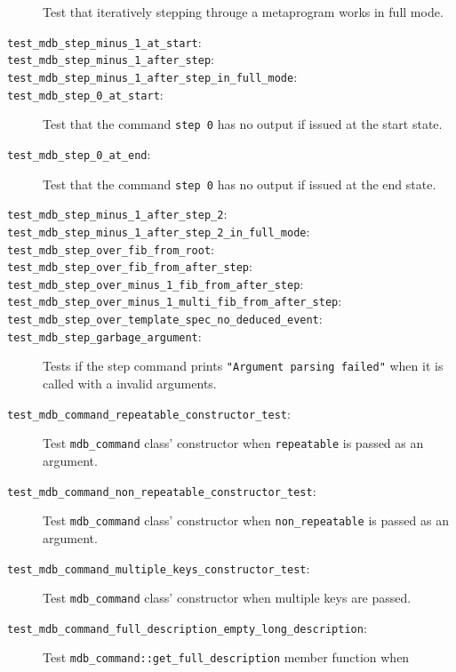 \begin{description}
        Test that iteratively stepping througe a metaprogram works in full
        mode.
    \item[\texttt{test\_mdb\_step\_minus\_1\_at\_start}:]
    \item[\texttt{test\_mdb\_step\_minus\_1\_after\_step}:]
    \item[\texttt{test\_mdb\_step\_minus\_1\_after\_step\_in\_full\_mode}:]
    \item[\texttt{test\_mdb\_step\_0\_at\_start}:]
        Test that the command \texttt{step 0} has no output if issued at the
        start state.
    \item[\texttt{test\_mdb\_step\_0\_at\_end}:]
        Test that the command \texttt{step 0} has no output if issued at the
        end state.
    \item[\texttt{test\_mdb\_step\_minus\_1\_after\_step\_2}:]
    \item[\texttt{test\_mdb\_step\_minus\_1\_after\_step\_2\_in\_full\_mode}:]
    \item[\texttt{test\_mdb\_step\_over\_fib\_from\_root}:]
    \item[\texttt{test\_mdb\_step\_over\_fib\_from\_after\_step}:]
    \item[\texttt{test\_mdb\_step\_over\_minus\_1\_fib\_from\_after\_step}:]
    \item[\texttt{test\_mdb\_step\_over\_minus\_1\_multi\_fib\_from\_after\_step}:]
    \item[\texttt{test\_mdb\_step\_over\_template\_spec\_no\_deduced\_event}:]
    \item[\texttt{test\_mdb\_step\_garbage\_argument}:]
        Tests if the step command prints
        \texttt{"Argument parsing failed"} when it is called with a invalid
        arguments.
    \item[\texttt{test\_mdb\_command\_repeatable\_constructor\_test}:]
        Test \texttt{mdb\_command} class' constructor when \texttt{repeatable}
        is passed as an argument.
    \item[\texttt{test\_mdb\_command\_non\_repeatable\_constructor\_test}:]
        Test \texttt{mdb\_command} class' constructor when
        \texttt{non\_repeatable} is passed as an argument.
    \item[\texttt{test\_mdb\_command\_multiple\_keys\_constructor\_test}:]
        Test \texttt{mdb\_command} class' constructor when multiple keys are
        passed.
    \item[\texttt{test\_mdb\_command\_full\_description\_empty\_long\_description}:]
        Test \texttt{mdb\_command::get\_full\_description} member function when

\end{description}
